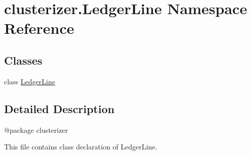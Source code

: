 \hypertarget{namespaceclusterizer_1_1LedgerLine}{}\section{clusterizer.\+Ledger\+Line Namespace Reference}
\label{namespaceclusterizer_1_1LedgerLine}
\subsection*{Classes}
\begin{DoxyCompactItemize}
\item 
class \hyperlink{classclusterizer_1_1LedgerLine_1_1LedgerLine}{Ledger\+Line}
\end{DoxyCompactItemize}


\subsection{Detailed Description}
\begin{DoxyVerb}@package clusterizer

This file contains class declaration of LedgerLine.
\end{DoxyVerb}
 